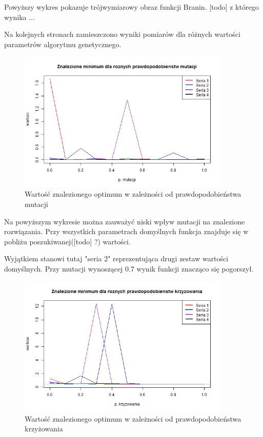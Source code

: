 \documentclass[11pt, a4paper]{article}
\newcommand{\fbi}{\leavevmode{\parindent=1em\indent}}
\begin{document}
\fbi
Powyższy wykres pokazuje trójwymiarowy obraz funkcji Branin.
[todo] z którego wynika ...

\fbi
Na kolejnych stronach zamieszczono wyniki pomiarów dla różnych wartości parametrów algorytmu genetycznego.

\begin{figure}[H]
	\centering
	\includegraphics[width=0.9\textwidth]{./assets/Branin2.png}
	\caption{Wartość znalezionego optimum w zależności od prawdopodobieństwa mutacji}
	\label{fig:branin2}
\end{figure}

\fbi
Na powyższym wykresie można zauważyć niski wpływ mutacji na znalezione rozwiązania. Przy wszystkich parametrach domyślnych funkcja znajduje się w pobliżu poszukiwanej([todo] ?) wartości.

\fbi
Wyjątkiem stanowi tutaj "seria 2" reprezentująca drugi zestaw wartości domyślnych. Przy mutacji wynoszącej 0.7 wynik funkcji znacząco się pogorszył.


\begin{figure}[H]
	\centering
	\includegraphics[width=0.9\textwidth]{./assets/Branin3.png} %
	\caption{Wartość znalezionego optimum w zależności od prawdopodobieństwa krzyżowania}
	\label{fig:branin3}
\end{figure}
\end{document}
